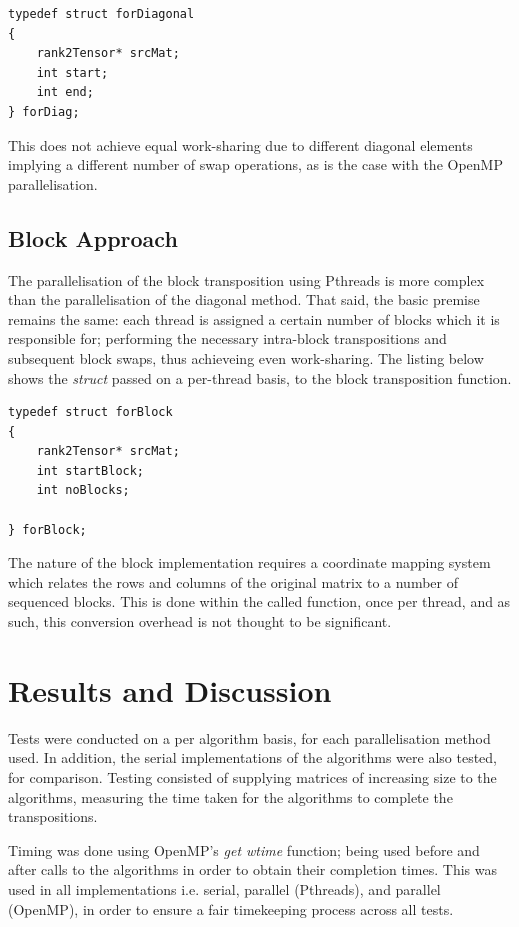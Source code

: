 \documentclass[journal,10pt]{IEEEtran}
\begin{document}
\begin{lstlisting}
typedef struct forDiagonal
{
    rank2Tensor* srcMat;
	int start;
	int end;
} forDiag;
\end{lstlisting}


This does not achieve equal work-sharing due to different diagonal elements implying a different number of swap operations, as is the case with the OpenMP parallelisation.


\subsection{Block Approach}
The parallelisation of the block transposition using Pthreads is more complex than the parallelisation of the diagonal method. That said, the basic premise remains the same: each thread is assigned a certain number of blocks which it is responsible for; performing the necessary intra-block transpositions and subsequent block swaps, thus achieveing even work-sharing. The listing below shows the \textit{struct} passed on a per-thread basis, to the block transposition function.


\begin{lstlisting}
typedef struct forBlock
{
	rank2Tensor* srcMat;
	int startBlock;
	int noBlocks;

} forBlock;
\end{lstlisting}

The nature of the block implementation requires a coordinate mapping system which relates the rows and columns of the original matrix to a number of sequenced blocks. This is done within the called function, once per thread, and as such, this conversion overhead is not thought to be significant.

\section{Results and Discussion}

Tests were conducted on a per algorithm basis, for each parallelisation method used. In addition, the serial implementations of the algorithms were also tested, for comparison. Testing consisted of supplying matrices of increasing size to the algorithms, measuring the time taken for the algorithms to complete the transpositions.

Timing was done using OpenMP's \textit{get wtime} function; being used before and after calls to the algorithms in order to obtain their completion times. This was used in all implementations i.e. serial, parallel (Pthreads), and parallel (OpenMP), in order to ensure a fair timekeeping process across all tests.
\end{document}
